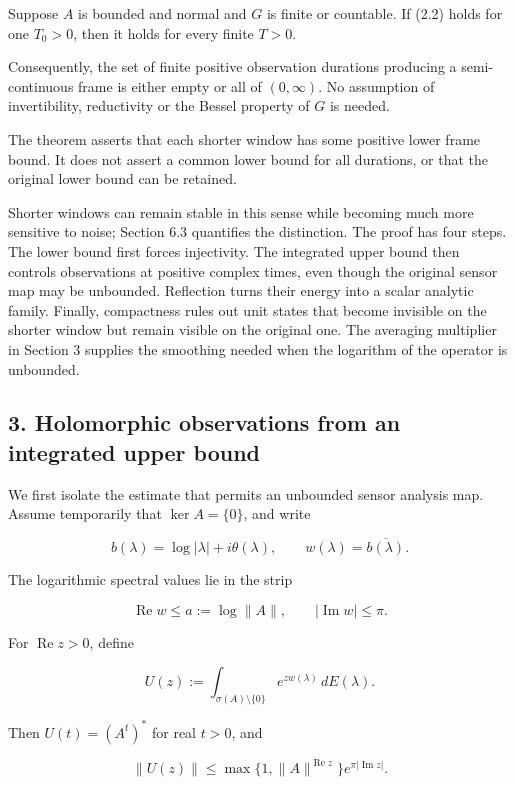 \documentclass[
  11pt,
]{article}
\begin{document}
Suppose \(A\) is bounded and normal and \(G\) is finite or countable. If
(2.2) holds for one \(T_0>0\), then it holds for every finite \(T>0\).

Consequently, the set of finite positive observation durations producing
a semi-continuous frame is either empty or all of \((0,\infty)\). No
assumption of invertibility, reductivity or the Bessel property of \(G\)
is needed.

The theorem asserts that each shorter window has some positive lower
frame bound. It does not assert a common lower bound for all durations,
or that the original lower bound can be retained.

Shorter windows can remain stable in this sense while becoming much more
sensitive to noise; Section 6.3 quantifies the distinction. The proof
has four steps. The lower bound first forces injectivity. The integrated
upper bound then controls observations at positive complex times, even
though the original sensor map may be unbounded. Reflection turns their
energy into a scalar analytic family. Finally, compactness rules out
unit states that become invisible on the shorter window but remain
visible on the original one. The averaging multiplier in Section 3
supplies the smoothing needed when the logarithm of the operator is
unbounded.

\subsection{3. Holomorphic observations from an integrated upper
bound}\label{holomorphic-observations-from-an-integrated-upper-bound}

We first isolate the estimate that permits an unbounded sensor analysis
map. Assume temporarily that \(\ker A=\{0\}\), and write

\[
b(\lambda)=\log|\lambda|+i\theta(\lambda),
\qquad w(\lambda)=\overline{b(\lambda)}.
\]

The logarithmic spectral values lie in the strip

\[
\operatorname{Re}w\leq a:=\log\|A\|,
\qquad |\operatorname{Im}w|\leq\pi.               \tag{3.1}
\]

For \(\operatorname{Re}z>0\), define

\[
U(z):=\int_{\sigma(A)\setminus\{0\}}
            e^{z w(\lambda)}\,dE(\lambda).       \tag{3.2}
\]

Then \(U(t)=(A^t)^*\) for real \(t>0\), and

\[
\|U(z)\|\leq
\max\{1,\|A\|^{\operatorname{Re}z}\}
e^{\pi|\operatorname{Im}z|}.                     \tag{3.3}
\]
\end{document}
